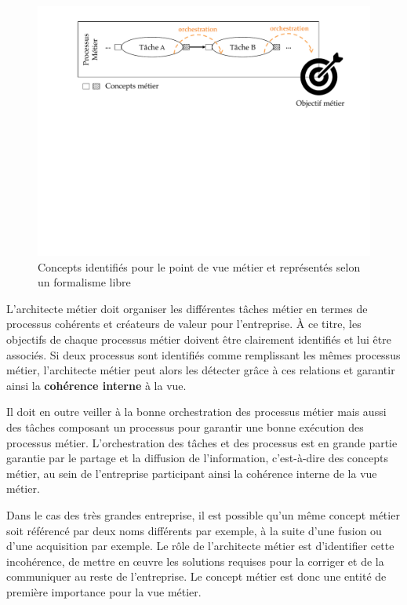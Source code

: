     \begin{figure}[!ht]
     \begin{center}
     \includegraphics[trim= 0cm 11cm 0cm 0cm, width=1\textwidth]{figures/4_demarche/concepts_vue_metier.pdf} \end{center}
     \caption{Concepts identifiés pour le point de vue métier et représentés selon un formalisme libre}
     \label{fig:concepts_vue_metier}
    \end{figure}

    L'architecte métier doit organiser les différentes tâches métier en
    termes de processus cohérents et créateurs de valeur pour l'entreprise. À ce titre, les objectifs de chaque processus
    métier doivent être clairement identifiés et lui être associés.
    Si deux processus sont identifiés comme remplissant les mêmes processus métier, l'architecte métier
    peut alors les détecter grâce à ces relations et garantir ainsi la \textbf{cohérence interne }à la vue.

    Il doit en outre veiller à la bonne orchestration des processus métier
    mais aussi des tâches composant un processus pour garantir une bonne exécution des processus métier.
    L'orchestration des tâches et des processus est en grande partie garantie par le partage
    et la diffusion de l'information, c'est-à-dire des concepts métier, au sein de l'entreprise participant ainsi la cohérence
    interne de la vue métier.

    Dans le cas des très grandes entreprise, il est possible qu'un même concept métier
    soit référencé par deux noms différents par exemple, à la suite d'une fusion ou d'une acquisition par exemple.
    Le rôle de l'architecte métier est d'identifier cette incohérence, de mettre en œuvre les solutions requises pour
    la corriger et de la communiquer au reste de l'entreprise.
    Le concept métier est donc une entité de première importance pour la vue métier.

